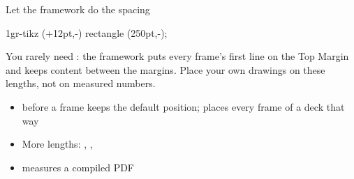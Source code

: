 \begin{standardframe}{Let the framework do the spacing}
\begin{minipage}[t]{0.5\linewidth}
\begin{tikzillustration}[scale=\grscale, every node/.style={font=\SMCodeFont\fontsize{5.6}{6.5}\selectfont}]{1gr-tikz}
			 (\SMFrametitleLeftPadding+12pt,-\SMContentTopAlign-30pt) rectangle (250pt,-\SMContentTopAlign-26pt);
		\end{tikzillustration}
	\end{minipage}\hfill
	\begin{minipage}[t]{0.46\linewidth}\vspace{0pt}
		{\small\SMLineTop You rarely need : the framework puts every
		frame's first line on the Top Margin and keeps content between the
		margins. Place your own drawings on these lengths, not on measured
		numbers.\par}
		\medskip
		\begin{itemize}
			\item {} before a frame keeps the default position;  places every frame of a deck that way
			\item More lengths: , , 
			\item {} measures a compiled PDF
		\end{itemize}
	\end{minipage}
\end{standardframe}
